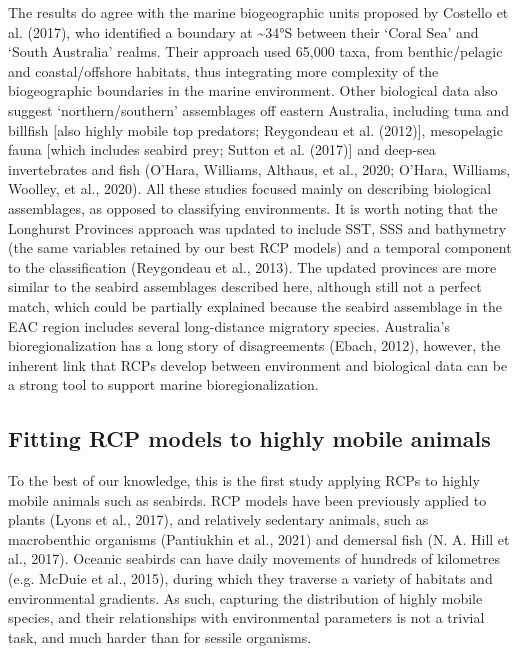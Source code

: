 \documentclass{article}
\begin{document}
\begin{linenumbers}
The results do agree with the marine biogeographic units proposed by Costello et al. (2017), who identified a boundary at \textasciitilde34°S between their `Coral Sea' and `South Australia' realms. Their approach used 65,000 taxa, from benthic/pelagic and coastal/offshore habitats, thus integrating more complexity of the biogeographic boundaries in the marine environment. Other biological data also suggest `northern/southern' assemblages off eastern Australia, including tuna and billfish {[}also highly mobile top predators; Reygondeau et al. (2012){]}, mesopelagic fauna {[}which includes seabird prey; Sutton et al. (2017){]} and deep-sea invertebrates and fish (O'Hara, Williams, Althaus, et al., 2020; O'Hara, Williams, Woolley, et al., 2020). All these studies focused mainly on describing biological assemblages, as opposed to classifying environments. It is worth noting that the Longhurst Provinces approach was updated to include SST, SSS and bathymetry (the same variables retained by our best RCP models) and a temporal component to the classification (Reygondeau et al., 2013). The updated provinces are more similar to the seabird assemblages described here, although still not a perfect match, which could be partially explained because the seabird assemblage in the EAC region includes several long-distance migratory species. Australia's bioregionalization has a long story of disagreements (Ebach, 2012), however, the inherent link that RCPs develop between environment and biological data can be a strong tool to support marine bioregionalization.

\hypertarget{fitting-rcp-models-to-highly-mobile-animals}{%
\subsection{Fitting RCP models to highly mobile animals}\label{fitting-rcp-models-to-highly-mobile-animals}}

To the best of our knowledge, this is the first study applying RCPs to highly mobile animals such as seabirds. RCP models have been previously applied to plants (Lyons et al., 2017), and relatively sedentary animals, such as macrobenthic organisms (Pantiukhin et al., 2021) and demersal fish (N. A. Hill et al., 2017). Oceanic seabirds can have daily movements of hundreds of kilometres (e.g. McDuie et al., 2015), during which they traverse a variety of habitats and environmental gradients. As such, capturing the distribution of highly mobile species, and their relationships with environmental parameters is not a trivial task, and much harder than for sessile organisms.


\end{linenumbers}
\end{document}
